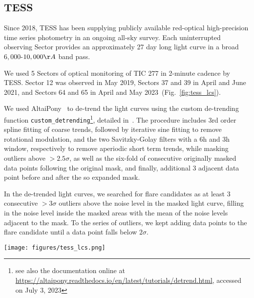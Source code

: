 \documentclass[twocolumn]{aastex631}
\begin{document}
\subsection{TESS}
\label{sec:obs:tess}
Since 2018, TESS has been supplying publicly available red-optical high-precision time series photometry in an ongoing all-sky survey. Each uninterrupted observing Sector provides an approximately 27 day long light curve in a broad $6,000$-$10,000\AA$ band pass. 

We used 5 Sectors of optical monitoring of TIC 277 in 2-minute cadence by TESS. Sector 12 was observed in May 2019, Sectors 37 and 39 in April and June 2021, and Sectors 64 and 65 in April and May 2023~(Fig.~\ref{fig:tess_lcs}). 

We used AltaiPony~\citep{ilin2021altaipony} to de-trend the light curves using the custom de-trending function \texttt{custom\_detrending}\footnote{see also the documentation online at \url{https://altaipony.readthedocs.io/en/latest/tutorials/detrend.html}, accessed on July 3, 2023}, detailed in~\citet{ilin2022searching}. The procedure includes 3rd order spline fitting of coarse trends, followed by iterative sine fitting to remove rotational modulation, and the two Savitzky-Golay filters with a 6h and 3h window, respectively to remove aperiodic short term trends, while masking outliers above $>2.5\sigma$, as well as the six-fold of consecutive originally masked data points following the original mask, and finally, additional 3 adjacent data point before and after the so expanded mask. 

In the de-trended light curves, we searched for flare candidates as at least 3 consecutive $>3\sigma$ outliers above the noise level in the masked light curve, filling in the noise level inside the masked areas with the mean of the noise levels adjacent to the mask. To the series of outliers, we kept adding data points to the flare candidate until a data point falls below $2\sigma$. 

\begin{figure*}
    \begin{centering}
        \texttt{[image: figures/tess\_lcs.png]}
        \caption{
         Normalized TESS light curves. Black and red dots show the light curve with and without rotational variability and trends, respectively. The de-trended light curve is offset by $0.2$. The large, rotationally modulated, flare, localized at about 81 deg latitude by~\citet{ilin2021giant}, appears in the second half of the top panel~(Sector 12).}
        \label{fig:tess_lcs}
    \end{centering}
\end{figure*}
\end{document}

